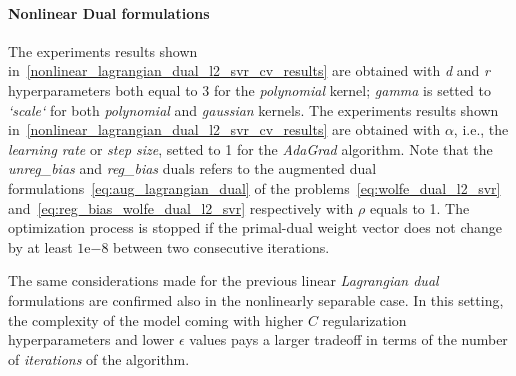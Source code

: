 \paragraph{Nonlinear Dual formulations}

The experiments results shown in~\ref{nonlinear_lagrangian_dual_l2_svr_cv_results} are obtained with \emph{d} and \emph{r} hyperparameters both equal to 3 for the \emph{polynomial} kernel; \emph{gamma} is setted to \emph{`scale`} for both \emph{polynomial} and \emph{gaussian} kernels. The experiments results shown in~\ref{nonlinear_lagrangian_dual_l2_svr_cv_results} are obtained with $\alpha$, i.e., the \emph{learning rate} or \emph{step size}, setted to 1 for the \emph{AdaGrad} algorithm. Note that the \emph{unreg\_bias} and \emph{reg\_bias} duals refers to the augmented dual formulations~\eqref{eq:aug_lagrangian_dual} of the problems~\eqref{eq:wolfe_dual_l2_svr} and~\eqref{eq:reg_bias_wolfe_dual_l2_svr} respectively with $\rho$ equals to 1. The optimization process is stopped if the primal-dual weight vector does not change by at least $1\mathrm{e}{-8}$  between two consecutive iterations.



The same considerations made for the previous linear \emph{Lagrangian dual} formulations are confirmed also in the nonlinearly separable case. In this setting, the complexity of the model coming with higher $C$ regularization hyperparameters and lower $\epsilon$ values pays a larger tradeoff in terms of the number of \emph{iterations} of the algorithm.

